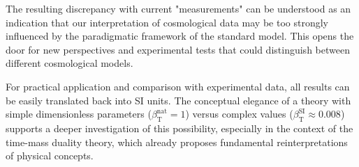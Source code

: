 ﻿\documentclass[12pt,a4paper]{article}
\newcommand{\betaT}{\beta_{\text{T}}}
\begin{document}
	The resulting discrepancy with current "measurements" can be understood as an indication that our interpretation of cosmological data may be too strongly influenced by the paradigmatic framework of the standard model. This opens the door for new perspectives and experimental tests that could distinguish between different cosmological models.
	
	For practical application and comparison with experimental data, all results can be easily translated back into SI units. The conceptual elegance of a theory with simple dimensionless parameters (\(\betaT^{\text{nat}} = 1\)) versus complex values (\(\betaT^{\text{SI}} \approx 0.008\)) supports a deeper investigation of this possibility, especially in the context of the time-mass duality theory, which already proposes fundamental reinterpretations of physical concepts.
	
\end{document}

